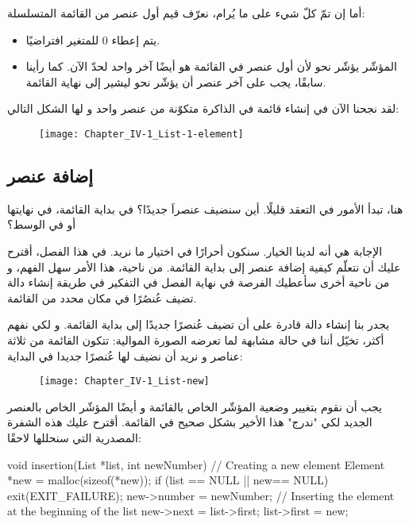 أما إن تمّ كلّ شيء على ما يُرام، نعرّف قيم أول عنصر من القائمة المتسلسلة:

\begin{itemize}
	\item يتم إعطاء $ 0 $ للمتغير
	افتراضيًا.
	\item المؤشّر
	يؤشّر نحو
	لأن أول عنصر في القائمة هو أيضًا آخر واحد لحدّ الآن. كما رأينا سابقًا، يجب على آخر عنصر أن يؤشّر نحو
	ليشير إلى نهاية القائمة.
\end{itemize}

لقد نجحنا الآن في إنشاء قائمة في الذاكرة متكوّنة من عنصر واحد و لها الشكل التالي:

\begin{figure}[H]
	\centering
	\texttt{[image: Chapter\_IV-1\_List-1-element]}
\end{figure}

\subsection{إضافة عنصر}

هنا، تبدأ الأمور في التعقد قليلًا. أين سنضيف عنصراَ جديدًا؟ في بداية القائمة، في نهايتها أو في الوسط؟

الإجابة هي أنه لدينا الخيار. سنكون أحرارًا في اختيار ما نريد. في هذا الفصل، أقترح عليك أن نتعلّم كيفية إضافة عنصر إلى بداية القائمة. من ناحية، هذا الأمر سهل الفهم، و من ناحية أخرى سأعطيك الفرصة في نهاية الفصل في التفكير في طريقة إنشاء دالة تضيف عُنصُرًا في مكان محدد من القائمة.

يجدر بنا إنشاء دالة قادرة على أن تضيف عُنصرًا جديدًا إلى بداية القائمة. و لكي نفهم أكثر، تخيّل أننا في حالة مشابهة لما تعرضه الصورة الموالية: تتكون القائمة من ثلاثة عناصر و نريد أن نضيف لها عُنصرًا جديدا في البداية:

\begin{figure}[H]
	\centering
	\texttt{[image: Chapter\_IV-1\_List-new]}
\end{figure}

يجب أن نقوم بتغيير وضعية المؤشّر
الخاص بالقائمة و أيضًا المؤشّر
الخاص بالعنصر الجديد لكي "ندرج" هذا الأخير بشكل صحيح في القائمة. أقترح عليك هذه الشفرة المصدرية التي سنحللها لاحقًا:

\begin{Csource}
void insertion(List *list, int newNumber)
{
	// Creating a new element
	Element *new = malloc(sizeof(*new));
	if (list == NULL || new== NULL)
	{
		exit(EXIT_FAILURE);
	}
	new->number = newNumber;	
	// Inserting the element at the beginning of the list
	new->next = list->first;
	list->first = new;
}
\end{Csource}

